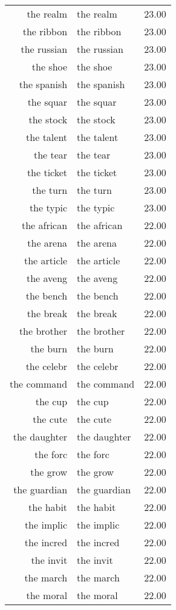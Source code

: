 \begin{table}[ht]
\begin{tabular}{rlr}
  the realm & the realm & 23.00 \\ 
  the ribbon & the ribbon & 23.00 \\ 
  the russian & the russian & 23.00 \\ 
  the shoe & the shoe & 23.00 \\ 
  the spanish & the spanish & 23.00 \\ 
  the squar & the squar & 23.00 \\ 
  the stock & the stock & 23.00 \\ 
  the talent & the talent & 23.00 \\ 
  the tear & the tear & 23.00 \\ 
  the ticket & the ticket & 23.00 \\ 
  the turn & the turn & 23.00 \\ 
  the typic & the typic & 23.00 \\ 
  the african & the african & 22.00 \\ 
  the arena & the arena & 22.00 \\ 
  the article & the article & 22.00 \\ 
  the aveng & the aveng & 22.00 \\ 
  the bench & the bench & 22.00 \\ 
  the break & the break & 22.00 \\ 
  the brother & the brother & 22.00 \\ 
  the burn & the burn & 22.00 \\ 
  the celebr & the celebr & 22.00 \\ 
  the command & the command & 22.00 \\ 
  the cup & the cup & 22.00 \\ 
  the cute & the cute & 22.00 \\ 
  the daughter & the daughter & 22.00 \\ 
  the forc & the forc & 22.00 \\ 
  the grow & the grow & 22.00 \\ 
  the guardian & the guardian & 22.00 \\ 
  the habit & the habit & 22.00 \\ 
  the implic & the implic & 22.00 \\ 
  the incred & the incred & 22.00 \\ 
  the invit & the invit & 22.00 \\ 
  the march & the march & 22.00 \\ 
  the moral & the moral & 22.00 \\ 

\end{tabular}
\end{table}
